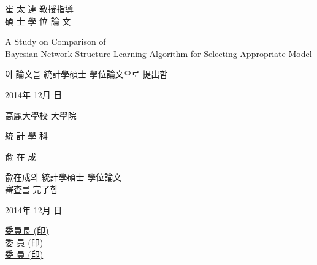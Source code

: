 \documentclass[12pt,a4paper,oneside]{book}
\theoremstyle{plain}
\theoremstyle{definition}
\theoremstyle{remark}
\theoremstyle{definition}
\numberwithin{equation}{chapter}
\begin{document}
\newpage{}
 \linespread{1.0}
 \thispagestyle{empty}
 \vspace{15mm}
 \begin{center}
 {\Large 崔 太 連 敎授指導 \\ 碩 士 學 位 論 文
}
 \end{center}
 \vspace{20mm}
 \begin{center}
  \LARGE A Study on Comparison of\\ Bayesian Network Structure Learning Algorithm for Selecting Appropriate Model
 \end{center}
 \vspace{20mm}
 \begin{center}
 {\Large 이 論文을 統計學碩士 學位論文으로 提出함}
 \end{center}
 \vspace{15mm}
 \begin{center}
 {\Large 2014年 \quad 12月 \quad 日}
 \end{center}
 \vspace{20mm}
 \begin{center}
 {\Large 高麗大學校 大學院}
 \end{center}
	 \begin{center}
  {\Large 統 計 學 科}
 \end{center}
 \begin{center}
 {\Large 兪 \quad\quad 在 \quad\quad 成}
 \end{center}
 \linespread{1.6}





\newpage{}		
 \linespread{1.0}
 \thispagestyle{empty}
 \vspace{20mm}
 \begin{center}
 {\LARGE 兪在成의 統計學碩士 學位論文 \\ 審査를 完了함}
 \end{center}
 \vspace{50mm}
 \begin{center}
{\Large 2014年 \quad 12月 \quad 日}
 \end{center}
 \vspace{55mm}
 \begin{center}
 {\Large  \underline{委員長 \hspace{60mm} (印)} \\ \vspace{7mm}
          \underline{委 \quad 員\hspace{60mm} (印)} \\ \vspace{7mm}
          \underline{委 \quad 員\hspace{60mm} (印)} \\ }
 \end{center}
 \linespread{1.6}
\end{document}
